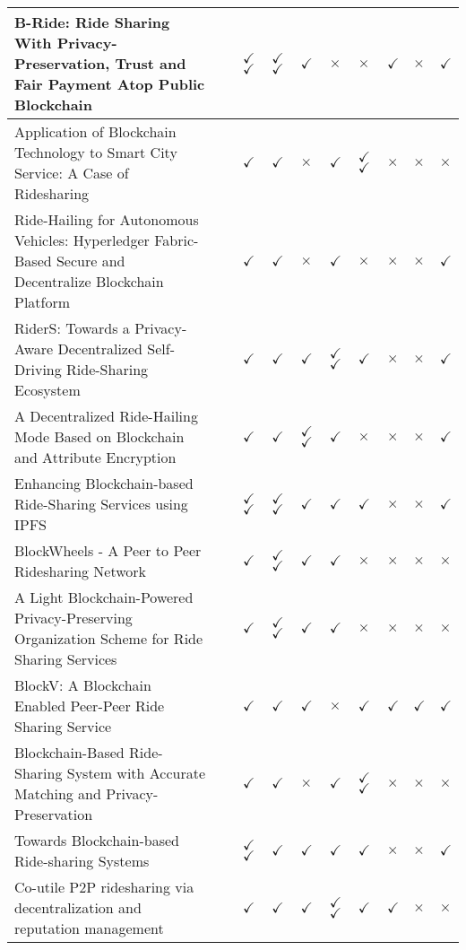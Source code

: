 \begin{longtable}{p{5cm}l|l|l|l|l|l|l|l|l}
B-Ride: Ride Sharing With Privacy-Preservation, Trust and Fair Payment Atop Public Blockchain & ~\cite{Baza.2021} & $\checkmark$ $\checkmark$ & $\checkmark$ $\checkmark$ & $\checkmark$  & $\times$ & $\times$ & $\checkmark$ & $\times$ & $\checkmark$  \\
\hline
Application of Blockchain Technology to Smart City Service: A Case of Ridesharing & ~\cite{Chang.} & $\checkmark$ & $\checkmark$ & $\times$ & $\checkmark$  & $\checkmark$ $\checkmark$ & $\times$ & $\times$ & $\times$ \\
\hline
Ride-Hailing for Autonomous Vehicles: Hyperledger Fabric-Based Secure and Decentralize Blockchain Platform & ~\cite{Shivers.} & $\checkmark$ & $\checkmark$ & $\times$ & $\checkmark$ & $\times$ & $\times$ & $\times$ & $\checkmark$  \\
\hline
RiderS: Towards a Privacy-Aware Decentralized Self-Driving Ride-Sharing Ecosystem & ~\cite{Bathen.} & $\checkmark$ & $\checkmark$ & $\checkmark$ & $\checkmark$$\checkmark$ & $\checkmark$ & $\times$ & $\times$ & $\checkmark$ \\
\hline
A Decentralized Ride-Hailing Mode Based on Blockchain and Attribute Encryption & ~\cite{Zhang.} & $\checkmark$& $\checkmark$ & $\checkmark$ $\checkmark$ & $\checkmark$ & $\times$ & $\times$ & $\times$ & $\checkmark$  \\
\hline
Enhancing Blockchain-based Ride-Sharing Services using IPFS & ~\cite{Mahmoud.2022} & $\checkmark$$\checkmark$ & $\checkmark$$\checkmark$ & $\checkmark$ & $\checkmark$ & $\checkmark$ & $\times$ & $\times$ & $\checkmark$  \\
\hline
BlockWheels - A Peer to Peer Ridesharing Network & ~\cite{Joseph.} & $\checkmark$ & $\checkmark$$\checkmark$ & $\checkmark$ & $\checkmark$ & $\times$  & $\times$  & $\times$ & $\times$  \\
\hline
A Light Blockchain-Powered Privacy-Preserving Organization Scheme for Ride Sharing Services & ~\cite{Baza.52520205282020} & $\checkmark$ & $\checkmark$ $\checkmark$ & $\checkmark$ & $\checkmark$ & $\times$ & $\times$ & $\times$ & $\times$ \\
\hline
\pagebreak
BlockV: A Blockchain Enabled Peer-Peer Ride Sharing Service & ~\cite{Pal.} & $\checkmark$ & $\checkmark$ & $\checkmark$ & $\times$  & $\checkmark$ & $\checkmark$  &  $\checkmark$ &  $\checkmark$ \\
\hline
Blockchain-Based Ride-Sharing System with Accurate Matching and Privacy-Preservation & ~\cite{Badr.} &  $\checkmark$ & $\checkmark$ & $\times$ & $\checkmark$  & $\checkmark$ $\checkmark$ & $\times$ & $\times$ & $\times$ \\
\hline
Towards Blockchain-based Ride-sharing Systems & ~\cite{Vazquez.} & $\checkmark$ $\checkmark$ & $\checkmark$ & $\checkmark$ & $\checkmark$ & $\checkmark$ & $\times$ & $\times$ & $\checkmark$  \\
\hline
Co-utile P2P ridesharing via decentralization and reputation management & ~\cite{Sanchez.2016} &  $\checkmark$ &  $\checkmark$ &  $\checkmark$ &  $\checkmark$  $\checkmark$ &  $\checkmark$ &  $\checkmark$ & $\times$ & $\times$   \\
\hline
\end{longtable}


